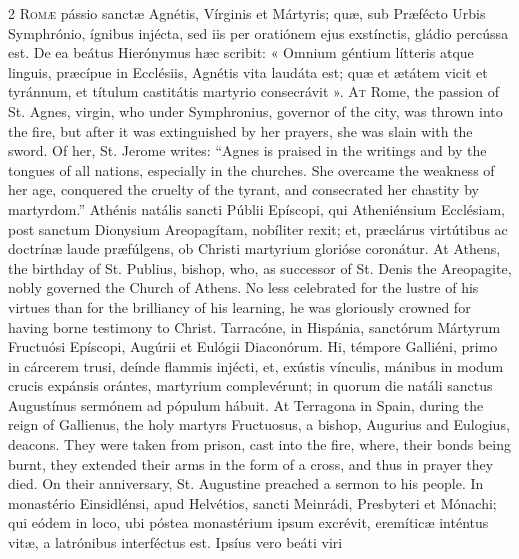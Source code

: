 \begin{paracol}{2}
\lettrine[lines=2]{R}{omæ} pássio sanctæ Agnétis, Vírginis et 
 Mártyris; quæ, sub Præfécto Urbis Symphrónio, ígnibus injécta, sed iis per 
 oratiónem ejus exstínctis, gládio percússa est. De ea beátus 
 Hierónymus hæc scribit: « Omnium géntium lítteris atque linguis, præcípue in Ecclésiis, Agnétis vita laudáta est; quæ et ætátem vicit et tyránnum, et títulum castitátis martyrio consecrávit ».
\switchcolumn
{}
\lettrine[lines=2]{A}{t} Rome, the passion of St. Agnes, virgin, who under Symphronius, governor 
 of the city, was thrown into the fire, but after it was extinguished by her 
 prayers, she was slain with the sword. Of her, St. Jerome writes: 
 ``Agnes is praised in the writings and by the tongues of all nations, 
 especially in the churches. She overcame the weakness of her age, 
 conquered the cruelty of the tyrant, and consecrated her chastity by 
 martyrdom.''
\switchcolumn*
{}
Athénis natális sancti Públii Epíscopi, qui Atheniénsium Ecclésiam, post 
 sanctum Dionysium Areopagítam, nobíliter rexit; et, præclárus 
 virtútibus ac doctrínæ laude præfúlgens, ob Christi martyrium glorióse 
 coronátur.
\switchcolumn
{}
At Athens, the birthday of St. Publius, bishop, who, as successor of St. 
 Denis the Areopagite, nobly governed the Church of Athens. No less 
 celebrated for the lustre of his virtues than for the brilliancy of his 
 learning, he was gloriously crowned for having borne testimony to Christ.
\switchcolumn*
{}
Tarracóne, in Hispánia, sanctórum Mártyrum Fructuósi Epíscopi, Augúrii et 
 Eulógii Diaconórum. Hi, témpore Galliéni, primo in cárcerem trusi, 
 deínde flammis injécti, et, exústis vínculis, mánibus in modum crucis 
 expánsis orántes, martyrium complevérunt; in quorum die natáli sanctus 
 Augustínus sermónem ad pópulum hábuit.
\switchcolumn
{}
At Terragona in Spain, during the reign of Gallienus, the holy martyrs 
 Fructuosus, a bishop, Augurius and Eulogius, deacons. They were taken 
 from prison, cast into the fire, where, their bonds being burnt, they 
 extended their arms in the form of a cross, and thus in prayer they died. 
 On their anniversary, St. Augustine preached a sermon to his people.
\switchcolumn*
{}
In monastério Einsidlénsi, apud Helvétios, sancti Meinrádi, Presbyteri et 
 Mónachi; qui eódem in loco, ubi póstea monastérium ipsum excrévit, eremíticæ 
 inténtus vitæ, a latrónibus interféctus est. Ipsíus vero beáti viri 

\end{paracol}
